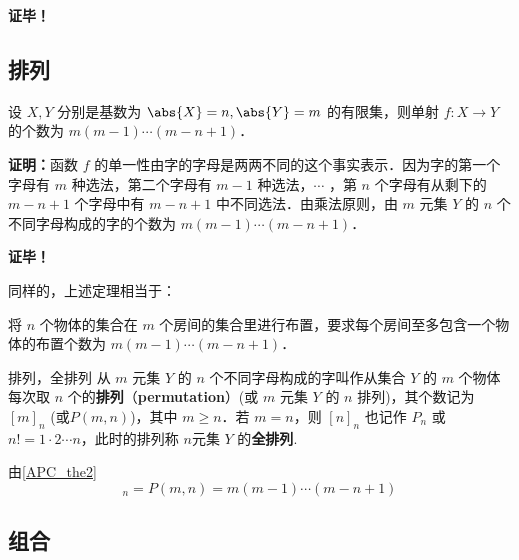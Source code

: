 \textbf{证毕！}
\subsection{排列}
\begin{theorem}{}
设 $X,Y$ 分别是基数为 $\abs{X}=n,\abs{Y}=m$ 的有限集，则单射 $f:X\rightarrow Y$ 的个数为 $m(m-1)\cdots(m-n+1)$．
\end{theorem}
\textbf{证明：}函数 $f$ 的单一性由字的字母是两两不同的这个事实表示．因为字的第一个字母有 $m$ 种选法，第二个字母有 $m-1$ 种选法，$\cdots$ ，第 $n$ 个字母有从剩下的 $m-n+1$ 个字母中有 $m-n+1$ 中不同选法．由乘法原则，由 $m$ 元集 $Y$ 的 $n$ 个不同字母构成的字的个数为 $m(m-1)\cdots(m-n+1)$．

\textbf{证毕！}

同样的，上述定理相当于：
\begin{theorem}{}\label{APC_the2}
将 $n$ 个物体的集合在 $m$ 个房间的集合里进行布置，要求每个房间至多包含一个物体的布置个数为 $m(m-1)\cdots(m-n+1)$．
\end{theorem}

\begin{definition}{排列，全排列}\label{APC_def3}
从 $m$ 元集 $Y$ 的 $n$ 个不同字母构成的字叫作从集合 $Y$ 的 $m$ 个物体每次取 $n$ 个的\textbf{排列}（\textbf{permutation}）(或 $m$ 元集 $Y$ 的 $n$ 排列)，其个数记为 $[m]_n$ (或$P(m,n)$)，其中 $m\geq n$．若 $m=n$，则 $[n]_n$ 也记作 $P_n$ 或 $n!=1\cdot2\cdots n$，此时的排列称 $n$元集 $Y$ 的\textbf{全排列}.
\end{definition}
由\autoref{APC_the2} 
\begin{equation}
[m]_n=P(m,n)=m(m-1)\cdots(m-n+1)
\end{equation}

\subsection{组合}


